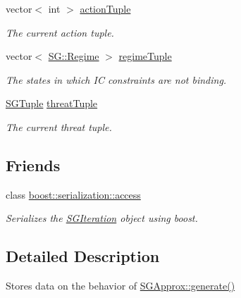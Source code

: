 \begin{DoxyCompactItemize}
\mbox{\label{classSGIteration_ade2d5d602a23f5a83a76283fa4dcec87}} 
vector$<$ int $>$ \hyperlink{classSGIteration_ade2d5d602a23f5a83a76283fa4dcec87}{action\+Tuple}
\begin{DoxyCompactList}\small\item\em The current action tuple. \end{DoxyCompactList}\item 
\mbox{\label{classSGIteration_a81c6328aac47bae67d8d7fdd175af738}} 
vector$<$ \hyperlink{namespaceSG_a139e4dec41ea0f38aae1f93f60cfff60}{S\+G\+::\+Regime} $>$ \hyperlink{classSGIteration_a81c6328aac47bae67d8d7fdd175af738}{regime\+Tuple}
\begin{DoxyCompactList}\small\item\em The states in which IC constraints are not binding. \end{DoxyCompactList}\item 
\mbox{\label{classSGIteration_acaf191aa3e5adddbf1052602c927d03f}} 
\hyperlink{classSGTuple}{S\+G\+Tuple} \hyperlink{classSGIteration_acaf191aa3e5adddbf1052602c927d03f}{threat\+Tuple}
\begin{DoxyCompactList}\small\item\em The current threat tuple. \end{DoxyCompactList}\end{DoxyCompactItemize}
\subsection*{Friends}
\begin{DoxyCompactItemize}
\item 
\mbox{\label{classSGIteration_ac98d07dd8f7b70e16ccb9a01abf56b9c}} 
class \hyperlink{classSGIteration_ac98d07dd8f7b70e16ccb9a01abf56b9c}{boost\+::serialization\+::access}
\begin{DoxyCompactList}\small\item\em Serializes the \hyperlink{classSGIteration}{S\+G\+Iteration} object using boost. \end{DoxyCompactList}\end{DoxyCompactItemize}


\subsection{Detailed Description}
Stores data on the behavior of \hyperlink{classSGApprox_a9cf7330f7cab3f454b0850e778d132fa}{S\+G\+Approx\+::generate()} 

